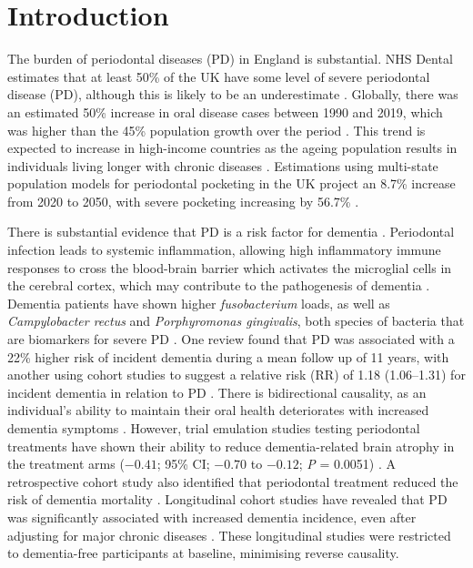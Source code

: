 \documentclass[11pt,a4paper]{article}
\begin{document}
\section{Introduction}

The burden of periodontal diseases (PD) in England is substantial. NHS Dental estimates that at least 50\% of the UK have some level of severe periodontal disease (PD), although this is likely to be an underestimate \cite{ref1}. Globally, there was an estimated 50\% increase in oral disease cases between 1990 and 2019, which was higher than the 45\% population growth over the period \cite{ref2}. This trend is expected to increase in high-income countries as the ageing population results in individuals living longer with chronic diseases \cite{ref3}. Estimations using multi-state population models for periodontal pocketing in the UK project an 8.7\% increase from 2020 to 2050, with severe pocketing increasing by 56.7\% \cite{ref4}.

There is substantial evidence that PD is a risk factor for dementia \cite{ref5,ref6}. Periodontal infection leads to systemic inflammation, allowing high inflammatory immune responses to cross the blood-brain barrier which activates the microglial cells in the cerebral cortex, which may contribute to the pathogenesis of dementia \cite{ref7,ref8}. Dementia patients have shown higher \textit{fusobacterium} loads, as well as \textit{Campylobacter rectus} and \textit{Porphyromonas gingivalis}, both species of bacteria that are biomarkers for severe PD \cite{ref9}. One review found that PD was associated with a 22\% higher risk of incident dementia during a mean follow up of 11 years, with another using cohort studies to suggest a relative risk (RR) of 1.18 (1.06--1.31) for incident dementia in relation to PD \cite{ref6,ref10}. There is bidirectional causality, as an individual's ability to maintain their oral health deteriorates with increased dementia symptoms \cite{ref11}. However, trial emulation studies testing periodontal treatments have shown their ability to reduce dementia-related brain atrophy in the treatment arms ($-0.41$; 95\% CI; $-0.70$ to $-0.12$; \textit{P} = 0.0051) \cite{ref12}. A retrospective cohort study also identified that periodontal treatment reduced the risk of dementia mortality \cite{ref13}. Longitudinal cohort studies have revealed that PD was significantly associated with increased dementia incidence, even after adjusting for major chronic diseases \cite{ref14,ref15,ref16}. These longitudinal studies were restricted to dementia-free participants at baseline, minimising reverse causality.
\end{document}
